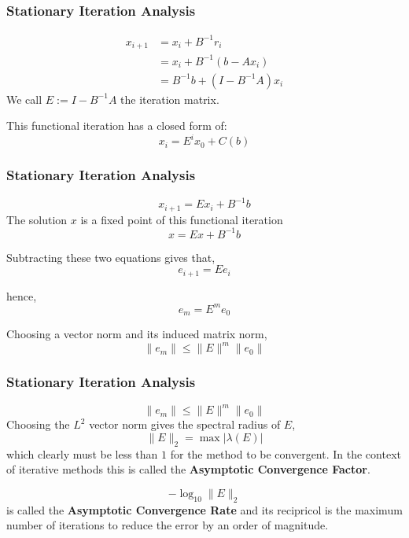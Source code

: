 \documentclass[xcolor=dvipsnames]{beamer}
\begin{document}
\begin{frame}
  \frametitle{Stationary Iteration Analysis}
  \begin{align*}
    x_{i+1} &= x_i + B^{-1} r_i\\
    &= x_i + B^{-1} (b - Ax_i)\\
    &= B^{-1} b + (I - B^{-1}A) x_i
  \end{align*}
  We call $E := I - B^{-1}A$ the iteration matrix. 

  \vspace{1em}

  This functional iteration has a closed form of:
  $$x_i = E^i x_0 + C(b)$$

\end{frame}

\begin{frame}
  \frametitle{Stationary Iteration Analysis}
  $$x_{i+1} = E x_i + B^{-1}b$$
  The solution $x$ is a fixed point of this functional iteration
  $$x = Ex + B^{-1}b$$

  Subtracting these two equations gives that,
  $$e_{i+1} = E e_i$$

  hence,
  $$e_m = E^m e_0$$

  Choosing a vector norm and its induced matrix norm,
  $$\|e_m\| \leq \|E\|^m \|e_0\|$$
\end{frame}

\begin{frame}
  \frametitle{Stationary Iteration Analysis}
  $$\|e_m\| \leq \|E\|^m \|e_0\|$$
  Choosing the $L^2$ vector norm gives the spectral radius of $E$,
  $$\|E\|_2 = \max |\lambda(E)|$$
  which clearly must be less than $1$ for the method to be convergent.
  In the context of iterative methods this is called the \textbf{Asymptotic Convergence Factor}.

  \vspace{1em}

  $$-\log_{10} \|E\|_2$$ is called the \textbf{Asymptotic Convergence Rate} and its recipricol is
  the maximum number of iterations to reduce the error by an order of magnitude.
\end{frame}
\end{document}
